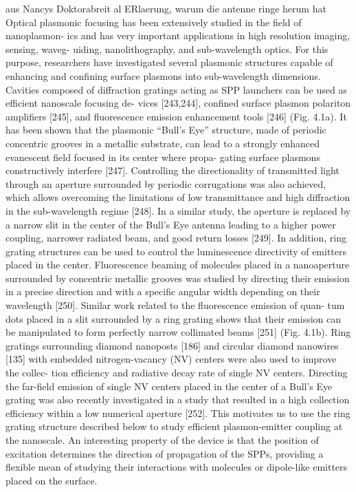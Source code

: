 	aus Nancys Doktorabreit al ERlaerung, warum die antenne ringe herum hat
	Optical plasmonic focusing has been extensively studied in the field of nanoplasmon- ics and has very important applications in high resolution imaging, sensing, waveg- uiding, nanolithography, and sub-wavelength optics. For this purpose, researchers have investigated several plasmonic structures capable of enhancing and confining surface plasmons into sub-wavelength dimensions. Cavities composed of diffraction gratings acting as SPP launchers can be used as efficient nanoscale focusing de- vices [243,244], confined surface plasmon polariton amplifiers [245], and fluorescence emission enhancement tools [246] (Fig. 4.1a). It has been shown that the plasmonic “Bull’s Eye” structure, made of periodic concentric grooves in a metallic substrate, can lead to a strongly enhanced evanescent field focused in its center where propa- gating surface plasmons constructively interfere [247]. Controlling the directionality of transmitted light through an aperture surrounded by periodic corrugations was also achieved, which allows overcoming the limitations of low transmittance and high diffraction in the sub-wavelength regime [248]. In a similar study, the aperture is replaced by a narrow slit in the center of the Bull’s Eye antenna leading to a higher power coupling, narrower radiated beam, and good return losses [249]. In addition, ring grating structures can be used to control the luminescence directivity of emitters placed in the center. Fluorescence beaming of molecules placed in a nanoaperture surrounded by concentric metallic grooves was studied by directing their emission in a precise direction and with a specific angular width depending on their wavelength [250]. Similar work related to the fluorescence emission of quan- tum dots placed in a slit surrounded by a ring grating shows that their emission can be manipulated to form perfectly narrow collimated beams [251] (Fig. 4.1b). Ring gratings surrounding diamond nanoposts [186] and circular diamond nanowires [135] with embedded nitrogen-vacancy (NV) centers were also used to improve the collec- tion efficiency and radiative decay rate of single NV centers. Directing the far-field emission of single NV centers placed in the center of a Bull’s Eye grating was also recently investigated in a study that resulted in a high collection efficiency within a low numerical aperture [252]. This motivates us to use the ring grating structure described below to study efficient plasmon-emitter coupling at the nanoscale. An interesting property of the device is that the position of excitation determines the direction of propagation of the SPPs, providing a flexible mean of studying their interactions with molecules or dipole-like emitters placed on the surface.

